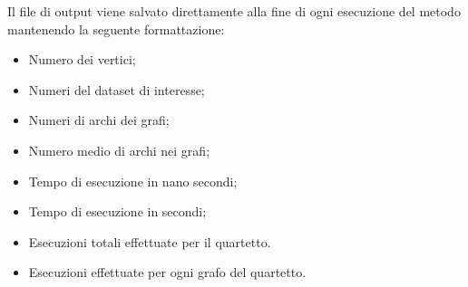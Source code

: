 Il file di output viene salvato direttamente alla fine di ogni esecuzione del metodo mantenendo la seguente formattazione:
\begin{itemize}
    \item Numero dei vertici;
    \item Numeri del dataset di interesse;
    \item Numeri di archi dei grafi;
    \item Numero medio di archi nei grafi;
    \item Tempo di esecuzione in nano secondi;
    \item Tempo di esecuzione in secondi;
    \item Esecuzioni totali effettuate per il quartetto.
    \item Esecuzioni effettuate per ogni grafo del quartetto.
\end{itemize}
